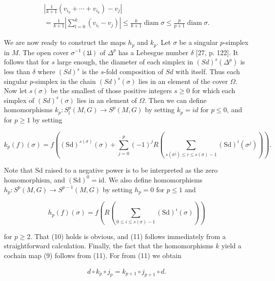 \[
\begin{aligned}\left|\frac{1}{k+1}(v_{i_{0}}+\cdots+v_{i_{k}})-v_{j}\right|\\ =\frac{1}{k+1}\left|\sum_{l=0}^{k}(v_{i_{l}}-v_{j})\right|\leq\frac{k}{k+1}\operatorname{diam}\sigma\leq\frac{p}{p+1}\operatorname{diam}\sigma.\end{aligned}
\]

We are now ready to construct the maps $h_p$ and $k_p$. Let $\sigma$ be a singular $p$-simplex in $M$. The open cover $\sigma^{-1}(\mathfrak{U})$ of $\Delta^p$ has a Lebesgue number $\delta$ [27, p. 122]. It follows that for $s$ large enough, the diameter of each simplex in $(Sd)^s(\Delta^p)$ is less than $\delta$ where $(Sd)^s$ is the $s$-fold composition of $Sd$ with itself. Thus each singular $p$-simplex in the chain $(Sd)^s(\sigma)$ lies in an element of the cover $\Omega$. Now let $s(\sigma)$ be the smallest of those positive integers $s \geq 0$ for which each simplex of $(Sd)^s(\sigma)$ lies in an element of $\Omega$. Then we can define homomorphisms $k_p: S_l^p(M,G) \to S^p(M,G)$ by setting $k_p = id$ for $p \leq 0$, and for $p \geq 1$ by setting

\begin{equation}
\tag{19}\label{eq:5.32:19}
k_{p}(f)(\sigma)=f\left((\mathrm{Sd})^{s(\sigma)}(\sigma)+\sum_{j=0}^{p}(-1)^{j}R\left(\sum_{s(\sigma^{j})\leq i\leq s(\sigma)-1}(\mathrm{Sd})^{i}(\sigma^{j})\right)\right).
\end{equation}

Note that Sd raised to a negative power is to be interpreted as the zero homomorphism, and $(\mathrm{Sd})^{0}=\mathrm{id}$. We also define homomorphisms  $ h_p: S^p(M,G) \to S^{p-1}(M,G) $ by setting  $ h_p = 0 $ for  $ p \leq 1 $ and

\begin{equation}
\tag{20}\label{eq:5.32:20}
h_{p}(f)(\sigma)=f\left(R\left(\sum_{0\leq i\leq s(\sigma)-1}(\mathrm{Sd})^{i}(\sigma)\right)\right)
\end{equation}

for $p \geq 2$. That (10) holds is obvious, and (11) follows immediately from a straightforward calculation. Finally, the fact that the homomorphisms $k$ yield a cochain map (9) follows from (11). For from (11) we obtain

\begin{equation}
\tag{21}\label{eq:5.32:21}
\begin{array}{r}{d\circ k_{p}\circ j_{p}=k_{p+1}\circ j_{p+1}\circ d.}\end{array}
\end{equation}

